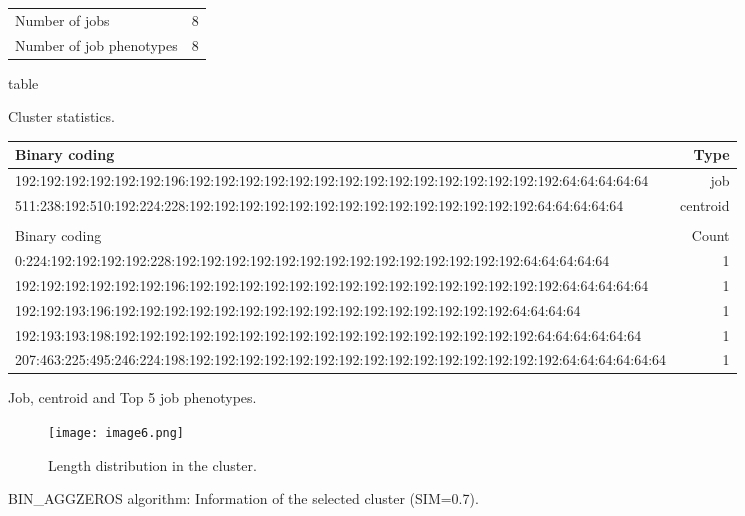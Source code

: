 \documentclass{jhps}
\begin{document}
\begin{cluster}
	\begin{subtable}{\textwidth}
		\centering
		\begin{tabular}{ll}
			Number of jobs & 8 \\
			Number of job phenotypes & 8 \\
		\end{tabular}
		\caption{table}{Cluster statistics.}
		\label{cluster:use_case:bin_aggzeros:stats}
	\end{subtable}
	\medskip
	\begin{subtable}{\textwidth}
		\centering
		\begin{tiny}
			\begin{tabular}{l|r}
				\rowcolor{tblhead}
				Binary coding                                                                                             &  Type     \\
				\hline
				192:192:192:192:192:192:196:192:192:192:192:192:192:192:192:192:192:192:192:192:192:192:64:64:64:64:64    &  job      \\
				511:238:192:510:192:224:228:192:192:192:192:192:192:192:192:192:192:192:192:192:192:64:64:64:64:64        &  centroid \\
				\multicolumn{2}{l}{}                                                                                      \\
				\rowcolor{tblhead}
				Binary coding                                                                                             &  Count    \\
				\hline
				0:224:192:192:192:192:228:192:192:192:192:192:192:192:192:192:192:192:192:192:192:64:64:64:64:64          &  1        \\
				192:192:192:192:192:192:196:192:192:192:192:192:192:192:192:192:192:192:192:192:192:192:64:64:64:64:64    &  1        \\
				192:192:193:196:192:192:192:192:192:192:192:192:192:192:192:192:192:192:192:192:64:64:64:64               &  1        \\
				192:193:193:198:192:192:192:192:192:192:192:192:192:192:192:192:192:192:192:192:192:64:64:64:64:64:64     &  1        \\
				207:463:225:495:246:224:198:192:192:192:192:192:192:192:192:192:192:192:192:192:192:192:64:64:64:64:64:64 &  1        \\
			\end{tabular}
		\end{tiny}
		\caption{Job, centroid and Top 5 job phenotypes.}
		\label{cluster:use_case:bin_aggzeros:top_jobs}
	\end{subtable}
	\medskip
	\begin{subfigure}{\textwidth}
		\centering
		\texttt{[image: image6.png]}
		\caption{Length distribution in the cluster.}
		\label{cluster:use_case:bin_aggzeros:length}
	\end{subfigure}
	\caption{BIN\_AGGZEROS algorithm: Information of the selected cluster (SIM=0.7).}
	\label{cluster:use_case:bin_aggzeros}
\end{cluster}
\end{document}

